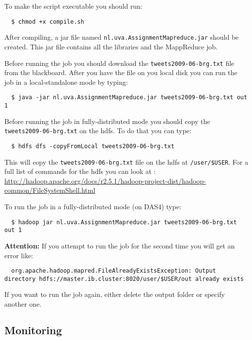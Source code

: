 \documentclass[a4paper,10pt]{article}
\begin{document}
To make the script executable you should run:
\begin{lstlisting}
  $ chmod +x compile.sh
\end{lstlisting}

After compiling, a jar file named \texttt{nl.uva.AssignmentMapreduce.jar} should be created. This jar file contains all the libraries and the MappReduce job. 

Before running the job you should download the \texttt{tweets2009-06-brg.txt} file from the blackboard. 
After you have the file on you local disk you can run the job in a local-standalone mode by typing:

\begin{lstlisting}
  $ java -jar nl.uva.AssignmentMapreduce.jar tweets2009-06-brg.txt out 1 
\end{lstlisting}

Before running the job in fully-distributed mode you should copy the \texttt{tweets2009-06-brg.txt} on the hdfs. To do that you can type:

\begin{lstlisting}
  $ hdfs dfs -copyFromLocal tweets2009-06-brg.txt
\end{lstlisting}

This will copy the \texttt{tweets2009-06-brg.txt} file on the hdfs at \texttt{/user/\$USER}. For a full list of commands for the hdfs you can look at : \url{http://hadoop.apache.org/docs/r2.5.1/hadoop-project-dist/hadoop-common/FileSystemShell.html}

To run the job in a fully-distributed mode (on DAS4) type: 
\begin{lstlisting}
  $ hadoop jar nl.uva.AssignmentMapreduce.jar tweets2009-06-brg.txt out 1
\end{lstlisting}

\textbf{Attention:} If you attempt to run the job for the second time you will get an error like:
\begin{lstlisting}
  org.apache.hadoop.mapred.FileAlreadyExistsException: Output directory hdfs://master.ib.cluster:8020/user/$USER/out already exists
\end{lstlisting}

If you want to run the job again, either delete the output folder or specify another one. 

\subsection{Monitoring}
\end{document}
